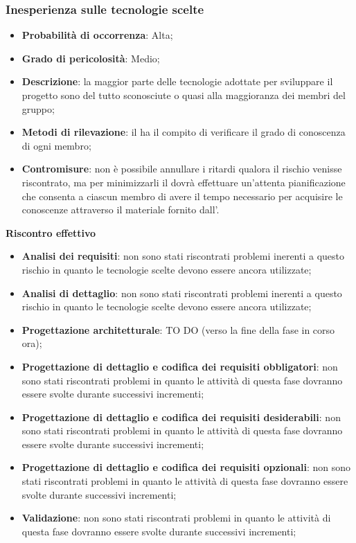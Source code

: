 		\subsubsection{Inesperienza sulle tecnologie scelte} %
		\label{ssub:inesperienza_sulle_tecnlogie_scelte}
			\begin{itemize}
				\item \textbf{Probabilità di occorrenza}: Alta;
				\item \textbf{Grado di pericolosità}: Medio;
				\item \textbf{Descrizione}: la maggior parte delle tecnologie adottate per sviluppare il progetto sono del tutto sconosciute o quasi alla maggioranza dei membri del gruppo;
				\item \textbf{Metodi di rilevazione}: il \roleProjectManager{} ha il compito di verificare il grado di conoscenza di ogni membro;
				\item \textbf{Contromisure}: non è possibile annullare i ritardi qualora il rischio venisse riscontrato, ma per minimizzarli il \roleProjectManager{} dovrà effettuare un'attenta pianificazione che consenta a ciascun membro di avere il tempo necessario per acquisire le conoscenze attraverso il materiale fornito dall'\roleAdministrator.
			\end{itemize}
		\noindent
		\textbf{Riscontro effettivo}
			\begin{itemize}
				\item \textbf{Analisi dei requisiti}: non sono stati riscontrati problemi inerenti a questo rischio in quanto le tecnologie scelte devono essere ancora utilizzate;
				\item \textbf{Analisi di dettaglio}: non sono stati riscontrati problemi inerenti a questo rischio in quanto le tecnologie scelte devono essere ancora utilizzate;
				\item \textbf{Progettazione architetturale}: TO DO (verso la fine della fase in corso ora);
				\item \textbf{Progettazione di dettaglio e codifica dei requisiti obbligatori}: non sono stati riscontrati problemi in quanto le attività di questa fase dovranno essere svolte durante successivi incrementi;
				\item \textbf{Progettazione di dettaglio e codifica dei requisiti desiderabili}: non sono stati riscontrati problemi in quanto le attività di questa fase dovranno essere svolte durante successivi incrementi;
				\item \textbf{Progettazione di dettaglio e codifica dei requisiti opzionali}: non sono stati riscontrati problemi in quanto le attività di questa fase dovranno essere svolte durante successivi incrementi;
				\item \textbf{Validazione}: non sono stati riscontrati problemi in quanto le attività di questa fase dovranno essere svolte durante successivi incrementi;
			\end{itemize}

